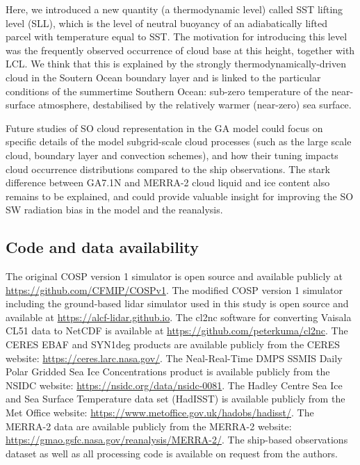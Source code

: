 Here, we introduced a new quantity (a thermodynamic level) called SST lifting
level (SLL), which is the level of neutral buoyancy of an adiabatically lifted
parcel with temperature equal to SST. The motivation for introducing this level
was the frequently observed occurrence of cloud base at this height, together with
LCL. We think that this is explained by the strongly thermodynamically-driven
cloud in the Soutern Ocean boundary layer and is linked to the particular
conditions of the summertime Southern Ocean: sub-zero temperature of the
near-surface atmosphere, destabilised by the relatively warmer (near-zero)
sea surface.

Future studies of SO cloud representation in the GA model could focus on
specific details of the model subgrid-scale cloud processes (such as the large
scale cloud, boundary layer and convection schemes), and how their tuning
impacts cloud occurrence distributions compared to the ship observations. The
stark difference between GA7.1N and MERRA-2 cloud liquid and ice content also
remains to be explained, and could provide valuable insight for improving the
SO SW radiation bias in the model and the reanalysis.

\small
\sffamily

\subsection*{Code and data availability}

The original COSP version 1 simulator is open source and available publicly at
\url{https://github.com/CFMIP/COSPv1}. The modified COSP version 1 simulator
including the ground-based lidar simulator used in this study is open source and
available at \url{https://alcf-lidar.github.io}. The cl2nc
software for converting Vaisala CL51 data to NetCDF is available at
\url{https://github.com/peterkuma/cl2nc}. The CERES EBAF and SYN1deg products
are available publicly from the CERES website:
\url{https://ceres.larc.nasa.gov/}. The Neal-Real-Time DMPS SSMIS Daily Polar
Gridded Sea Ice Concentrations product is available publicly from the NSIDC
website: \url{https://nsidc.org/data/nsidc-0081}. The Hadley Centre Sea Ice and
Sea Surface Temperature data set (HadISST) is available publicly from the Met
Office website: \url{https://www.metoffice.gov.uk/hadobs/hadisst/}. The MERRA-2
data are available publicly from the MERRA-2 website:
\url{https://gmao.gsfc.nasa.gov/reanalysis/MERRA-2/}. The ship-based
observations dataset as well as all processing code is available on request
from the authors.

